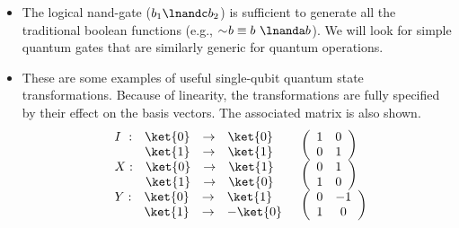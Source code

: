 \documentclass{slides}
\begin{document}
\begin{slide}{}

\begin{itemize}

	\item The logical nand-gate ($b_1\lnandc b_2$) is sufficient to generate all the traditional boolean functions (e.g., $\sim\negmedspace b \equiv b\ \lnanda b$).  We will look for simple quantum gates that are similarly generic for quantum operations.
\end{itemize}
\end{slide}

\begin{slide}{}


\begin{itemize}
	\item  These are some examples of useful single-qubit quantum state transformations.
Because of linearity, the transformations are fully specified by
their effect on the basis vectors. 
The associated matrix is also shown.
$$\begin{array}{ll}
\begin{array}{lrcl}
I\ :& \ket{0} & \to & \ket{0}\\
  & \ket{1} & \to & \ket{1}\\
\end{array} &
\left(\begin{array}{cc}1 & 0\\ 0 & 1\end{array}\right)\\
\begin{array}{lrcl}
X:& \ket{0} & \to & \ket{1}\\
  & \ket{1} & \to & \ket{0}\\
\end{array} &
\left(\begin{array}{cc}0 & 1\\ 1 & 0\end{array}\right)\\
\begin{array}{lrcl}
Y:& \ket{0} & \to & \ket{1}\\
  & \ket{1} & \to &-\ket{0}\\
\end{array} &
\left(\begin{array}{cc}0 & -1\\ 1 & 0\end{array}\right)\\

\end{array}$$
\end{itemize}
\end{slide}
\end{document}
